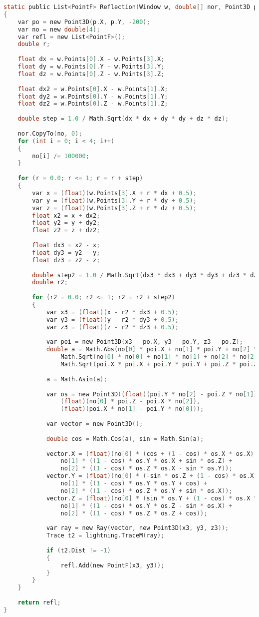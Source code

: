\begin{lstlisting}[label=lst:raytrac,caption=Реализация  оптимизированного алгоритма обратной трассировки лучей, language=c]
static public List<PointF> Reflection(Window w, double[] nor, Point3D p, Lightning lightning)
{
	var po = new Point3D(p.X, p.Y, -200);
	var no = new double[4];
	var refl = new List<PointF>();
	double r;
	
	float dx = w.Points[0].X - w.Points[3].X;
	float dy = w.Points[0].Y - w.Points[3].Y;
	float dz = w.Points[0].Z - w.Points[3].Z;
	
	float dx2 = w.Points[0].X - w.Points[1].X;
	float dy2 = w.Points[0].Y - w.Points[1].Y;
	float dz2 = w.Points[0].Z - w.Points[1].Z;
	
	double step = 1.0 / Math.Sqrt(dx * dx + dy * dy + dz * dz);
	
	nor.CopyTo(no, 0);
	for (int i = 0; i < 4; i++)
	{
		no[i] /= 100000;
	}
	
	for (r = 0.0; r <= 1; r = r + step)
	{
		var x = (float)(w.Points[3].X + r * dx + 0.5);
		var y = (float)(w.Points[3].Y + r * dy + 0.5);
		var z = (float)(w.Points[3].Z + r * dz + 0.5);
		float x2 = x + dx2;
		float y2 = y + dy2;
		float z2 = z + dz2;
		
		float dx3 = x2 - x;
		float dy3 = y2 - y;
		float dz3 = z2 - z;
		
		double step2 = 1.0 / Math.Sqrt(dx3 * dx3 + dy3 * dy3 + dz3 * dz3);
		double r2;
		
		for (r2 = 0.0; r2 <= 1; r2 = r2 + step2)
		{
			var x3 = (float)(x - r2 * dx3 + 0.5);
			var y3 = (float)(y - r2 * dy3 + 0.5);
			var z3 = (float)(z - r2 * dz3 + 0.5);
			
			var poi = new Point3D(x3 - po.X, y3 - po.Y, z3 - po.Z);
			double a = Math.Abs(no[0] * poi.X + no[1] * poi.Y + no[2] * poi.Z) /
				Math.Sqrt(no[0] * no[0] + no[1] * no[1] + no[2] * no[2]) /
				Math.Sqrt(poi.X * poi.X + poi.Y * poi.Y + poi.Z * poi.Z);
			
			a = Math.Asin(a);
			
			var os = new Point3D((float)(poi.Y * no[2] - poi.Z * no[1]),
				(float)(no[0] * poi.Z - poi.X * no[2]),
				(float)(poi.X * no[1] - poi.Y * no[0]));
			
			var vector = new Point3D();
			
			double cos = Math.Cos(a), sin = Math.Sin(a);
			
			vector.X = (float)(no[0] * (cos + (1 - cos) * os.X * os.X) + 
				no[1] * ((1 - cos) * os.Y * os.X + sin * os.Z) +
				no[2] * ((1 - cos) * os.Z * os.X - sin * os.Y));
			vector.Y = (float)(no[0] * (-sin * os.Z + (1 - cos) * os.X * os.Y) + 
				no[1] * ((1 - cos) * os.Y * os.Y + cos) +
				no[2] * ((1 - cos) * os.Z * os.Y + sin * os.X));
			vector.Z = (float)(no[0] * (sin * os.Y + (1 - cos) * os.X * os.Z) + 
				no[1] * ((1 - cos) * os.Y * os.Z - sin * os.X) +
				no[2] * ((1 - cos) * os.Z * os.Z + cos));
			
			var ray = new Ray(vector, new Point3D(x3, y3, z3));
			Trace t2 = lightning.TraceM(ray);
			
			if (t2.Dist != -1)
			{
				refl.Add(new PointF(x3, y3));
			}
		}
	}
	
	return refl;
}
\end{lstlisting}


